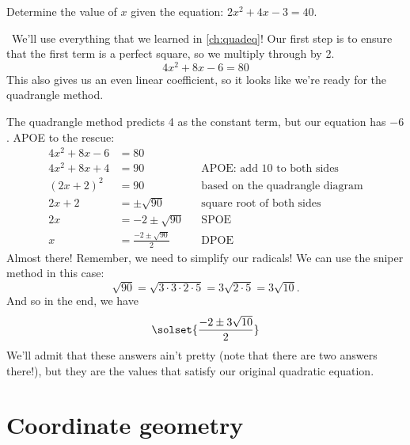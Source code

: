 \begin{boxex}
Determine the value of $x$ given the equation: $2x^2+4x-3=40$.

\exsoln\ We'll use everything that we learned in \cref{ch:quadeq}! Our first step is to ensure that the first term is a perfect square, so we multiply through by 2.
\[4x^2 + 8x - 6 = 80\]
This also gives us an even linear coefficient, so it looks like we're ready for the quadrangle method.
\begin{center}
\end{center}
The quadrangle method predicts 4 as the constant term, but our equation has $-6$. APOE to the rescue:
\begin{align*}
4x^2 + 8x - 6 &= 80
\\
4x^2 + 8x + 4 &= 90
&&\text{APOE: add 10 to both sides}
\\
(2x+2)^2 &= 90
&&\text{based on the quadrangle diagram}
\\
2x+2 &= \pm\sqrt{90}
&&\text{square root of both sides}
\\
2x &= -2 \pm\sqrt{90}
&&\text{SPOE}
\\[1ex]
x &= \frac{-2 \pm\sqrt{90}}{2}
&&\text{DPOE}
\end{align*}
Almost there! Remember, we need to simplify our radicals! We can use the sniper method in this case:
\[\sqrt{90} = \sqrt{3\cdot3\cdot2\cdot5} = 3\sqrt{2\cdot5} = 3\sqrt{10}.\]
And so in the end, we have
\[\solset{\frac{-2 \pm 3\sqrt{10}}{2}}\]
We'll admit that these answers ain't pretty (note that there are two answers there!), but they are the values that satisfy our original quadratic equation.
\end{boxex}

\section{Coordinate geometry}
\label{sec:coordgeometry}

